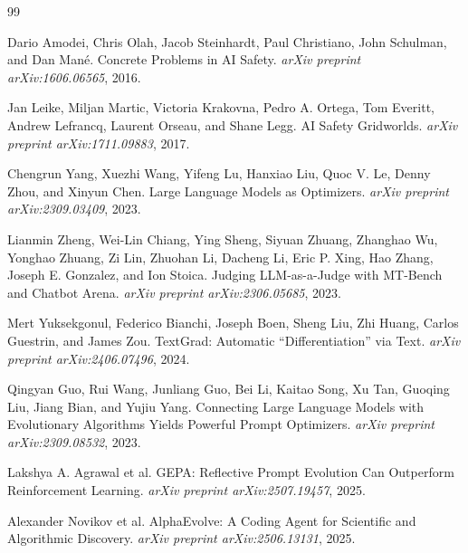 \documentclass[11pt]{article}
\begin{document}
\begin{thebibliography}{99}

Dario Amodei, Chris Olah, Jacob Steinhardt, Paul Christiano, John Schulman, and Dan Mané.
\newblock Concrete Problems in AI Safety.
\newblock \emph{arXiv preprint arXiv:1606.06565}, 2016.

Jan Leike, Miljan Martic, Victoria Krakovna, Pedro A. Ortega, Tom Everitt, Andrew Lefrancq, Laurent Orseau, and Shane Legg.
\newblock AI Safety Gridworlds.
\newblock \emph{arXiv preprint arXiv:1711.09883}, 2017.

Chengrun Yang, Xuezhi Wang, Yifeng Lu, Hanxiao Liu, Quoc V. Le, Denny Zhou, and Xinyun Chen.
\newblock Large Language Models as Optimizers.
\newblock \emph{arXiv preprint arXiv:2309.03409}, 2023.

Lianmin Zheng, Wei-Lin Chiang, Ying Sheng, Siyuan Zhuang, Zhanghao Wu, Yonghao Zhuang, Zi Lin, Zhuohan Li, Dacheng Li, Eric P. Xing, Hao Zhang, Joseph E. Gonzalez, and Ion Stoica.
\newblock Judging LLM-as-a-Judge with MT-Bench and Chatbot Arena.
\newblock \emph{arXiv preprint arXiv:2306.05685}, 2023.

Mert Yuksekgonul, Federico Bianchi, Joseph Boen, Sheng Liu, Zhi Huang, Carlos Guestrin, and James Zou.
\newblock TextGrad: Automatic ``Differentiation'' via Text.
\newblock \emph{arXiv preprint arXiv:2406.07496}, 2024.

Qingyan Guo, Rui Wang, Junliang Guo, Bei Li, Kaitao Song, Xu Tan, Guoqing Liu, Jiang Bian, and Yujiu Yang.
\newblock Connecting Large Language Models with Evolutionary Algorithms Yields Powerful Prompt Optimizers.
\newblock \emph{arXiv preprint arXiv:2309.08532}, 2023.

Lakshya A. Agrawal et al.
\newblock GEPA: Reflective Prompt Evolution Can Outperform Reinforcement Learning.
\newblock \emph{arXiv preprint arXiv:2507.19457}, 2025.

Alexander Novikov et al.
\newblock AlphaEvolve: A Coding Agent for Scientific and Algorithmic Discovery.
\newblock \emph{arXiv preprint arXiv:2506.13131}, 2025.

\end{thebibliography}
\end{document}
